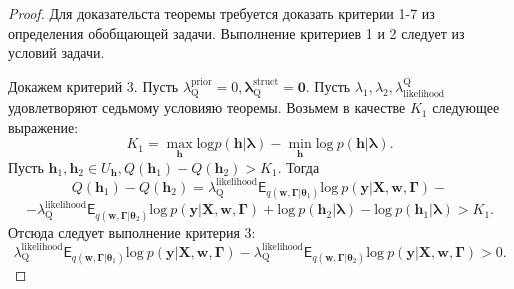 \begin{proof}
Для доказательста теоремы требуется доказать критерии 1-7 из определения обобщающей задачи.
Выполнение критериев 1 и 2 следует из условий задачи.

Докажем критерий 3. 
Пусть $\lambda^{\text{prior}}_\text{Q} = 0, \boldsymbol{\lambda}^\text{struct}_\text{Q} = \mathbf{0}$. 
Пусть $\lambda_1, \lambda_2, \lambda_\text{likelihood}^\text{Q}$ удовлетворяют седьмому условияю теоремы.
Возьмем в качестве $K_1$ следующее выражение:
\[
    K_1= \max_{\mathbf{h}} \text{log} p (\mathbf{h}|\boldsymbol{\lambda})-\min_{\mathbf{h}} \text{log}~p(\mathbf{h}|\boldsymbol{\lambda}).
\]
Пусть $\mathbf{h}_1, \mathbf{h}_2 \in U_\mathbf{h}, Q(\mathbf{h}_1)-Q(\mathbf{h}_2)>K_1$.
Тогда 
\[
Q(\mathbf{h}_1)-Q(\mathbf{h}_2) = \lambda^\text{likelihood}_\text{Q} \mathsf{E}_{q(\mathbf{w}, \boldsymbol{\Gamma}|\boldsymbol{\theta}_1)} \text{log}~p(\mathbf{y}|\mathbf{X}, \mathbf{w}, \boldsymbol{\Gamma})-\]
\[
-\lambda^\text{likelihood}_\text{Q}  \mathsf{E}_{q(\mathbf{w}, \boldsymbol{\Gamma}|\boldsymbol{\theta}_2)} \text{log}~p(\mathbf{y}|\mathbf{X}, \mathbf{w}, \boldsymbol{\Gamma})
+\text{log}~p(\mathbf{h}_2|\boldsymbol{\lambda})-\text{log}~p(\mathbf{h}_1|\boldsymbol{\lambda})>K_1.
\]
Отсюда следует  выполнение критерия 3:
\[
\lambda^\text{likelihood}_\text{Q} \mathsf{E}_{q(\mathbf{w}, \boldsymbol{\Gamma}|\boldsymbol{\theta}_1)} \text{log}~p(\mathbf{y}|\mathbf{X}, \mathbf{w}, \boldsymbol{\Gamma}) - \lambda^\text{likelihood}_\text{Q} \mathsf{E}_{q(\mathbf{w}, \boldsymbol{\Gamma}|\boldsymbol{\theta}_2)} \text{log}~p(\mathbf{y}|\mathbf{X}, \mathbf{w}, \boldsymbol{\Gamma}) > 0.
\]


\end{proof}
